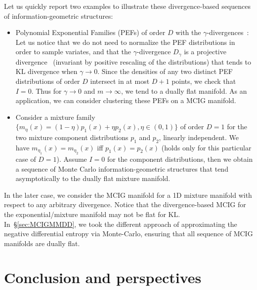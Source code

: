 \documentclass[graybox]{svmult}
\begin{document}
Let us quickly report two examples to illustrate these divergence-based sequences of information-geometric structures:

\begin{itemize}
	\item Polynomial Exponential Families (PEFs) of order $D$ with the $\gamma$-divergences~\cite{gammadiv-2014}: 
	Let us notice that we do not need to normalize the PEF distributions in order to sample variates, and that the $\gamma$-divergence $D_\gamma$ is a projective divergence~\cite{Holder-2017} (invariant by positive rescaling of the distributions) that tends to KL divergence when $\gamma\rightarrow 0$. 
	Since the densities of any two distinct PEF distributions of order $D$ intersect in at most $D+1$ points, we check that $I=0$.
	Thus for $\gamma\rightarrow 0$ and $m\rightarrow \infty$, we tend to a dually flat manifold.
	As an application, we can consider clustering these PEFs on a MCIG manifold.
	
	\item Consider a mixture family $\{m_\eta(x)=(1-\eta)p_1(x)+\eta p_2(x), \eta\in (0,1)\}$ of order $D=1$ for the two mixture component distributions $p_1$ and $p_2$, linearly independent. 
	We have $m_{\eta_1}(x)=m_{\eta_2}(x)$ iff $p_1(x)=p_2(x)$ (holds only for this particular case of $D=1$).
	Assume $I=0$ for the component distributions, then we obtain a sequence of Monte Carlo information-geometric structures that tend
	asymptotically to the dually flat mixture manifold.
\end{itemize}

In the later case, we consider the MCIG manifold for a 1D mixture manifold with respect to any arbitrary divergence.
Notice that the divergence-based MCIG for the exponential/mixture manifold  may not be flat for KL. 
In~\S\ref{sec:MCIGMMDD}, we took the different approach of approximating the negative differential entropy via Monte-Carlo, ensuring that all sequence of MCIG manifolds are dually flat.


\section{Conclusion and perspectives}\label{sec:concl}

%
\end{document}
